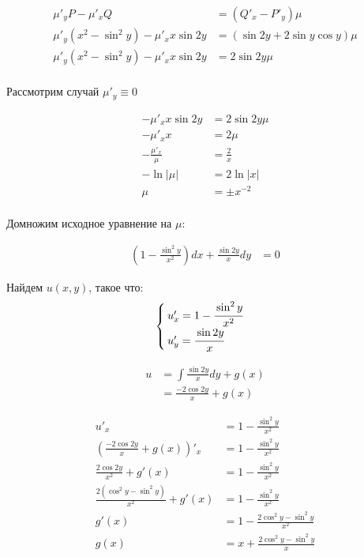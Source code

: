 \begin{align*}
    \mu'_y P - \mu'_x Q                       & = (Q'_x - P'_y) \mu             \\
    \mu'_y (x^2 - \sin^2 y) - \mu'_x x\sin 2y & = (\sin 2y + 2\sin y\cos y) \mu \\
    \mu'_y (x^2 - \sin^2 y) - \mu'_x x\sin 2y & = 2\sin 2y \mu                  \\
\end{align*}

Рассмотрим случай $\mu'_y \equiv 0$

\begin{align*}
    - \mu'_x x\sin 2y    & = 2\sin 2y \mu \\
    - \mu'_x x           & = 2 \mu        \\
    - \frac{\mu'_x}{\mu} & = \frac{2}{x}  \\
    - \ln |\mu|          & = 2\ln|x|      \\
    \mu                  & = \pm x^{-2}   \\
\end{align*}

Домножим исходное уравнение на $\mu$:

\begin{align*}
    \left(1 - \frac{\sin^2 y}{x^2}\right) dx + \frac{\sin 2y}{x} dy & = 0
\end{align*}

Найдем $u(x, y)$, такое что:
\[\begin{cases}
        u'_x = 1 - \cfrac{\sin^2 y}{x^2} \\
        u'_y = \cfrac{\sin 2y}{x}
    \end{cases}\]

\begin{align*}
    u & = \int \frac{\sin 2y}{x}dy + g(x) \\
      & = \frac{-2\cos 2y}{x} + g(x)
\end{align*}

\begin{align*}
    u'_x                                       & = 1 - \frac{\sin^2 y}{x^2}             \\
    \left(\frac{-2\cos 2y}{x} + g(x)\right)'_x & = 1 - \frac{\sin^2 y}{x^2}             \\
    \frac{2\cos 2y}{x^2} + g'(x)               & = 1 - \frac{\sin^2 y}{x^2}             \\
    \frac{2(\cos^2 y - \sin^2 y)}{x^2} + g'(x) & = 1 - \frac{\sin^2 y}{x^2}             \\
    g'(x)                                      & = 1 - \frac{2\cos^2 y - \sin^2 y}{x^2} \\
    g(x)                                       & = x + \frac{2\cos^2 y - \sin^2 y}{x}   \\
\end{align*}

